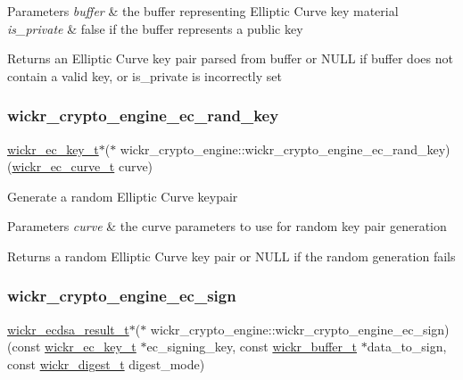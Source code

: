 \begin{DoxyParams}{Parameters}
{\em buffer} & the buffer representing Elliptic Curve key material \\
\hline
{\em is\+\_\+private} & false if the buffer represents a public key \\
\hline
\end{DoxyParams}
\begin{DoxyReturn}{Returns}
an Elliptic Curve key pair parsed from buffer or N\+U\+LL if buffer does not contain a valid key, or is\+\_\+private is incorrectly set 
\end{DoxyReturn}
\mbox{\label{group__wickr__crypto__engine_gad16b229b7d16cf00d3983c277ee3b88b}} 
\subsubsection{\texorpdfstring{wickr\_crypto\_engine\_ec\_rand\_key}{wickr\_crypto\_engine\_ec\_rand\_key}}
{\footnotesize\ttfamily \mbox{\hyperlink{structwickr__ec__key}{wickr\+\_\+ec\+\_\+key\+\_\+t}}$\ast$($\ast$ wickr\+\_\+crypto\+\_\+engine\+::wickr\+\_\+crypto\+\_\+engine\+\_\+ec\+\_\+rand\+\_\+key) (\mbox{\hyperlink{structwickr__ec__curve}{wickr\+\_\+ec\+\_\+curve\+\_\+t}} curve)}

Generate a random Elliptic Curve keypair


\begin{DoxyParams}{Parameters}
{\em curve} & the curve parameters to use for random key pair generation \\
\hline
\end{DoxyParams}
\begin{DoxyReturn}{Returns}
a random Elliptic Curve key pair or N\+U\+LL if the random generation fails 
\end{DoxyReturn}
\mbox{\label{group__wickr__crypto__engine_gac5a36d2a53e06a75a2b818e6a5cc96a1}} 
\subsubsection{\texorpdfstring{wickr\_crypto\_engine\_ec\_sign}{wickr\_crypto\_engine\_ec\_sign}}
{\footnotesize\ttfamily \mbox{\hyperlink{structwickr__ecdsa__result}{wickr\+\_\+ecdsa\+\_\+result\+\_\+t}}$\ast$($\ast$ wickr\+\_\+crypto\+\_\+engine\+::wickr\+\_\+crypto\+\_\+engine\+\_\+ec\+\_\+sign) (const \mbox{\hyperlink{structwickr__ec__key}{wickr\+\_\+ec\+\_\+key\+\_\+t}} $\ast$ec\+\_\+signing\+\_\+key, const \mbox{\hyperlink{structwickr__buffer}{wickr\+\_\+buffer\+\_\+t}} $\ast$data\+\_\+to\+\_\+sign, const \mbox{\hyperlink{structwickr__digest}{wickr\+\_\+digest\+\_\+t}} digest\+\_\+mode)}

